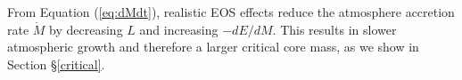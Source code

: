\documentclass[apj]{emulateapj}
\newcommand{\delad}{\nabla_{\rm ad}}
\newcommand{\cb}{_{\rm RCB}}
\begin{document}



From Equation (\ref{eq:dMdt}), realistic EOS effects reduce the atmosphere accretion rate $\dot{M}$ by decreasing $L$ and increasing $-dE/dM$. This results in slower atmospheric growth and therefore a larger critical core mass, as we show in Section \S\ref{critical}.



\end{document}
